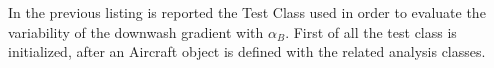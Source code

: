 In the previous listing is reported the Test Class used in order to evaluate the variability of the downwash gradient with $\alpha_B$. First of all the test class is initialized, after an Aircraft object is defined with the related analysis classes.

%
%
%
%
%
%
%
%
%
%
%
